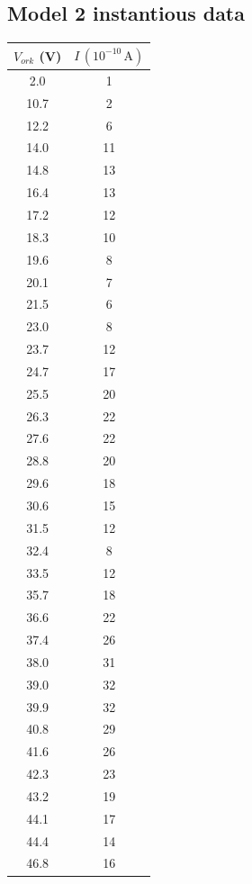 \documentclass[%
sor,
 jor,
 amsmath,amssymb,
 reprint,
longbibliography,
]{revtex4-2}
\begin{document}
\subsection{Model 2 instantious data}
\begin{table}[H]
\begin{minipage}[t]{0.48\textwidth}
\centering
\begin{tabular}{|c|c|}
\hline
$V_{ork}$ (V) & $I\,(10^{-10}\,\mathrm{A})$ \\
\hline
2.0 & 1 \\
10.7 & 2 \\
12.2 & 6 \\
14.0 & 11 \\
14.8 & 13 \\
16.4 & 13 \\
17.2 & 12 \\
18.3 & 10 \\
19.6 & 8 \\
20.1 & 7 \\
21.5 & 6 \\
23.0 & 8 \\
23.7 & 12 \\
24.7 & 17 \\
25.5 & 20 \\
26.3 & 22 \\
27.6 & 22 \\
28.8 & 20 \\
29.6 & 18 \\
30.6 & 15 \\
31.5 & 12 \\
32.4 & 8 \\
33.5 & 12 \\
35.7 & 18 \\
36.6 & 22 \\
37.4 & 26 \\
38.0 & 31 \\
39.0 & 32 \\
39.9 & 32 \\
40.8 & 29 \\
41.6 & 26 \\
42.3 & 23 \\
43.2 & 19 \\
44.1 & 17 \\
44.4 & 14 \\
46.8 & 16 \\
\end{tabular}
\end{minipage}%
\hfill %
\begin{minipage}[t]{0.48\textwidth}

\end{minipage}
\end{table}
\end{document}
